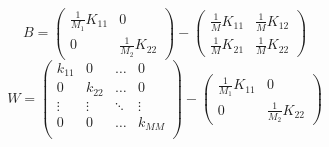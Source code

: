 \documentclass[preview]{standalone}
\begin{document}
\[
    B=\begin{pmatrix}
        \frac{1}{M_1}K_{11} & 0\\
        0 & \frac{1}{M_2}K_{22}
    \end{pmatrix}-\begin{pmatrix}
        \frac{1}{M}K_{11} & \frac{1}{M}K_{12} \\
        \frac{1}{M}K_{21} & \frac{1}{M}K_{22}
    \end{pmatrix}
\]
\[
    W=
    \begin{pmatrix}
        k_{11} & 0 & \dots & 0\\
        0 & k_{22} & \dots & 0\\
        \vdots & \vdots& \ddots & \vdots\\
        0 & 0& \dots & k_{MM}\\
    \end{pmatrix}
    -
    \begin{pmatrix}
        \frac{1}{M_1}K_{11} & 0\\
        0 & \frac{1}{M_2}K_{22}
    \end{pmatrix}
\]
\end{document}
